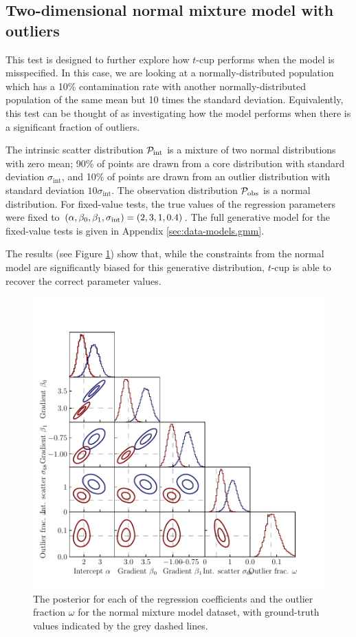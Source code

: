 \documentclass[fleqn,usenatbib]{rasti}
\begin{document}
\subsection{Two-dimensional normal mixture model with outliers}
\label{sec:results.gmm}

This test is designed to further explore how $t$-cup performs when the model is
misspecified. In this case, we are looking at a normally-distributed population
which has a 10\% contamination rate with another normally-distributed population
of the same mean but 10 times the standard deviation. Equivalently, this test
can be thought of as investigating how the model performs when there is a
significant fraction of outliers.

The intrinsic scatter distribution $\mathcal P_{\rm int}$ is a mixture of two
normal distributions with zero mean; 90\% of points are drawn from a core
distribution with standard deviation $\sigma_\textrm{int}$, and 10\% of points
are drawn from an outlier distribution with standard deviation $10
\sigma_\textrm{int}$. The observation distribution $\mathcal P_{\rm obs}$ is a
normal distribution. For fixed-value tests, the true values of the regression
parameters were fixed to $(\alpha, \beta_0, \beta_1, \sigma_{\rm int}) = (2,
3, 1, 0.4)$. The full generative model for the fixed-value tests is given in
Appendix \ref{sec:data-models.gmm}.

The results (see Figure \ref{fig:results.gmm.corner}) show that, while the
constraints from the normal model are significantly biased for this generative
distribution, $t$-cup is able to recover the correct parameter values.

\begin{figure}
    \includegraphics[width=\columnwidth]{graphics/fixed/corner_gaussian_mix.pdf}
    \caption{The posterior for each of the regression coefficients and the
    outlier fraction $\omega$ for the normal mixture model dataset, with
    ground-truth values indicated by the grey dashed lines.}
    \label{fig:results.gmm.corner}
\end{figure}
\end{document}
